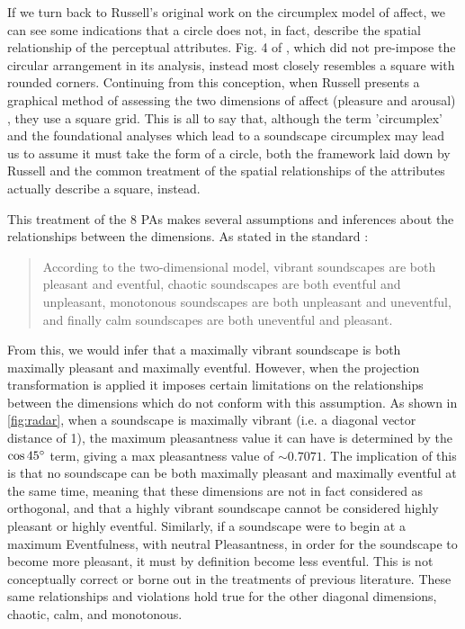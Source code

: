 If we turn back to Russell's original work on the circumplex model of affect, we can see some indications that a circle does not, in fact, describe the spatial relationship of the perceptual attributes. Fig. 4 of \citep{Russell1980circumplex}, which did not pre-impose the circular arrangement in its analysis, instead most closely resembles a square with rounded corners. Continuing from this conception, when Russell presents a graphical method of assessing the two dimensions of affect (pleasure and arousal) \citep{Russell1989Affect}, they use a square grid. This is all to say that, although the term 'circumplex' and the foundational analyses which lead to a soundscape circumplex may lead us to assume it must take the form of a circle, both the framework laid down by Russell and the common treatment of the spatial relationships of the attributes actually describe a square, instead.

This treatment of the 8 PAs makes several assumptions and inferences about the relationships between the dimensions. As stated in the standard \citep[p. 5]{ISO12913Part3}:

\begin{quote}
  According to the two-dimensional model, vibrant soundscapes are both pleasant and eventful, chaotic soundscapes are both eventful and unpleasant, monotonous soundscapes are both unpleasant and uneventful, and finally calm soundscapes are both uneventful and pleasant.
\end{quote}

From this, we would infer that a maximally vibrant soundscape is both maximally pleasant and maximally eventful. However, when the projection transformation is applied it imposes certain limitations on the relationships between the dimensions which do not conform with this assumption. As shown in \cref{fig:radar}, when a soundscape is maximally vibrant (i.e. a diagonal vector distance of 1), the maximum pleasantness value it can have is determined by the $\cos 45\degree$ term, giving a max pleasantness value of $\sim0.7071$. The implication of this is that no soundscape can be both maximally pleasant and maximally eventful at the same time, meaning that these dimensions are not in fact considered as orthogonal, and that a highly vibrant soundscape cannot be considered highly pleasant or highly eventful. Similarly, if a soundscape were to begin at a maximum Eventfulness, with neutral Pleasantness, in order for the soundscape to become more pleasant, it must by definition become less eventful. This is not conceptually correct or borne out in the treatments of previous literature. These same relationships and violations hold true for the other diagonal dimensions, chaotic, calm, and monotonous.

